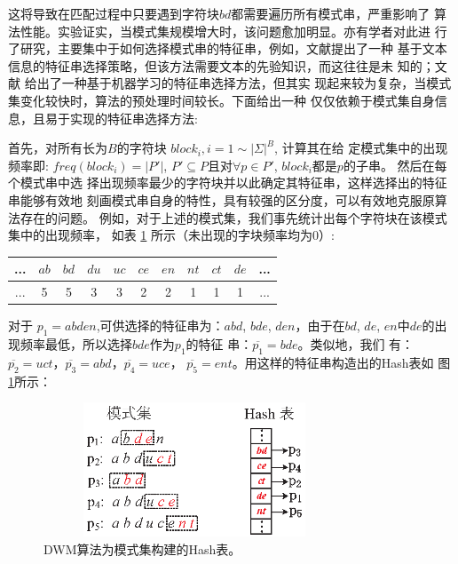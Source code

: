 这将导致在匹配过程中只要遇到字符块$bd$都需要遍历所有模式串，严重影响了
算法性能。实验证实，当模式集规模增大时，该问题愈加明显。亦有学者对此进
行了研究，主要集中于如何选择模式串的特征串，例如，文献\cite{}提出了一种
基于文本信息的特征串选择策略，但该方法需要文本的先验知识，而这往往是未
知的；文献\cite{Tan2011} 给出了一种基于机器学习的特征串选择方法，但其实
现起来较为复杂，当模式集变化较快时，算法的预处理时间较长。下面给出一种
仅仅依赖于模式集自身信息，且易于实现的特征串选择方法:

首先，对所有长为$B$的字符块 $block_i, i=1 \sim |\Sigma|^B$, 计算其在给
定模式集中的出现频率即: $freq(block_i)=|P'|$, $P' \subseteq
P$且对$\forall p \in P'$, $block_i$都是$p$的子串。 然后在每个模式串中选
择出现频率最少的字符块并以此确定其特征串，这样选择出的特征串能够有效地
刻画模式串自身的特性，具有较强的区分度，可以有效地克服原算法存在的问题。
例如，对于上述的模式集，我们事先统计出每个字符块在该模式集中的出现频率，
如表 \ref{tab:block_freq} 所示（未出现的字块频率均为0）:\\


\begin{table}[!htbp]
\centering
\vspace{-8pt}
\begin{tabular}{|c|c|c|c|c|c|c|c|c|c|c|} \hline
  ... & $ab$ & $bd$ & $du$ & $uc$ & $ce$ &  $en$ & $nt$ & $ct$ & $de$ & ... \\\hline
  ... & 5 & 5 & 3 & 3 & 2 & 2 & 1 & 1 & 1 & ... \\
  \hline
  \end{tabular}
  \label{tab:block_freq}
\end{table}


对于 $p_1=abden$,可供选择的特征串为：$abd$, $bde$, $den$，由于在$bd$,
$de$,
$en$中$de$的出现频率最低，所以选择$bde$作为$p_1$的特征
串：$\overline{p_1}=bde$。类似地，我们
有：$\overline{p_2}=uct$，$\overline{p_3}=abd$，$\overline{p_4}=uce$，
$\overline{p_5}=ent$。用这样的特征串构造出的Hash表如
图\ref{fig:WM_hash_table2}所示：

\begin{figure}[!h]
  \centering
  \includegraphics[height=4cm ,width=9cm]{figures/5_WM/WM_hash_table2.eps}
  \caption{DWM算法为模式集构建的Hash表。}
  \label{fig:WM_hash_table2}
\end{figure}

